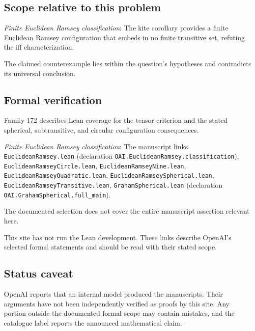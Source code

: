 \documentclass[11pt]{article}
\begin{document}
\subsection{Scope relative to this problem}
\textit{Finite Euclidean Ramsey classification}: The kite corollary provides a finite Euclidean Ramsey configuration that embeds in no finite transitive set, refuting the iff characterization.

The claimed counterexample lies within the question’s hypotheses and contradicts its universal conclusion.

\subsection{Formal verification}
Family 172 describes Lean coverage for the tensor criterion and the stated spherical, subtransitive, and circular configuration consequences.

\textit{Finite Euclidean Ramsey classification}: The manuscript links \texttt{EuclideanRamsey.lean} (declaration \texttt{OAI.EuclideanRamsey.classification}), \texttt{EuclideanRamseyCircle.lean}, \texttt{EuclideanRamseyNine.lean}, \texttt{EuclideanRamseyQuadratic.lean}, \texttt{EuclideanRamseySpherical.lean}, \texttt{EuclideanRamseyTransitive.lean}, \texttt{GrahamSpherical.lean} (declaration \texttt{OAI.GrahamSpherical.full\_main}).

The documented selection does not cover the entire manuscript assertion relevant here.

This site has not run the Lean development. These links describe OpenAI’s selected formal statements and should be read with their stated scope.

\subsection{Status caveat}
OpenAI reports that an internal model produced the manuscripts. Their arguments have not been independently verified as proofs by this site. Any portion outside the documented formal scope may contain mistakes, and the catalogue label reports the announced mathematical claim.
\end{document}
